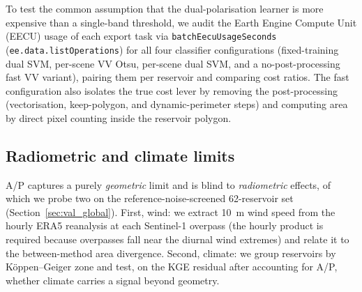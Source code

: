 To test the common assumption that the dual-polarisation learner is more
expensive than a single-band threshold, we audit the Earth Engine Compute Unit
(EECU) usage of each export task via \texttt{batchEecuUsageSeconds}
(\texttt{ee.data.listOperations}) for all four classifier configurations
(fixed-training dual SVM, per-scene VV Otsu, per-scene dual SVM, and a
no-post-processing fast VV variant), pairing them per reservoir and comparing
cost ratios. The fast configuration also isolates the true cost lever by
removing the post-processing (vectorisation, keep-polygon, and
dynamic-perimeter steps) and computing area by direct pixel counting inside
the reservoir polygon.

\subsection{Radiometric and climate limits}
\label{sec:methods_wind}

A/P captures a purely \emph{geometric} limit and is blind to
\emph{radiometric} effects, of which we probe two on the reference-noise-screened
62-reservoir set (Section~\ref{sec:val_global}). First, wind: we extract 10~m
wind speed from the hourly ERA5 reanalysis \citep{Hersbach2020} at each
Sentinel-1 overpass (the hourly product is required because overpasses fall near
the diurnal wind extremes) and relate it to the between-method area divergence.
Second, climate: we group reservoirs by K\"oppen--Geiger zone and test, on the
KGE residual after accounting for A/P, whether climate carries a signal beyond
geometry.
